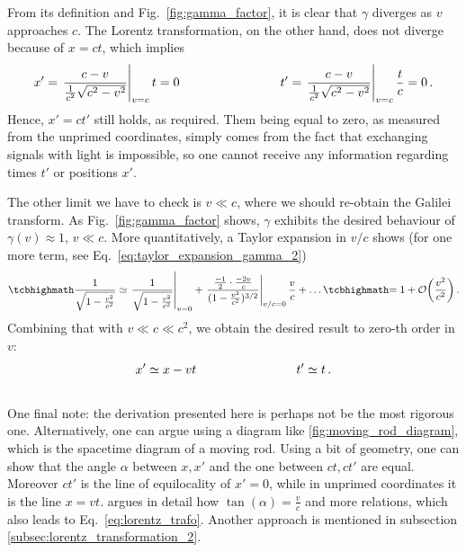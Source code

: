 \documentclass[../relativity_main.tex]{subfiles}
\begin{document}
From its definition and Fig.~\ref{fig:gamma_factor}, it is clear that $\gamma$ diverges as $v$ approaches $c$. The Lorentz transformation, on the other hand, does not diverge because of $x = ct$, which implies
\begin{align*}
	x' = \eval{\frac{c - v}{\frac{1}{c^2} \sqrt{c^2 - v^2}}}_{v = c} t = 0
	\manyqquad
	t' = \eval{\frac{c - v}{\frac{1}{c^2} \sqrt{c^2 - v^2}}}_{v = c} \frac{t}{c} = 0 \, .
\end{align*}
Hence, $x' = ct'$ still holds, as required. Them being equal to zero, as measured from the unprimed coordinates, simply comes from the fact that exchanging signals with light is impossible, so one cannot receive any information regarding times $t'$ or positions $x'$.


The other limit we have to check is $v \ll c$, where we should re-obtain the Galilei transform. As Fig.~\ref{fig:gamma_factor} shows, $\gamma$ exhibits the desired behaviour of $\gamma(v) \approx 1, \, v \ll c$. More quantitatively, a Taylor expansion in $v / c$ shows (for one more term, see Eq.~\eqref{eq:taylor_expansion_gamma_2})
\begin{equation}\label{eq:taylor_expansion_gamma}
	\eqbox{\frac{1}{\sqrt{1 - \frac{v^2}{c^2}}}} \simeq \eval{\frac{1}{\sqrt{1 - \frac{v^2}{c^2}}}}_{v = 0} + \eval{\frac{\frac{-1}{2} \cdot \frac{-2 v}{c}}{(1 - \frac{v^2}{c^2})^{3/2}}}_{v / c = 0} \frac{v}{c} + \dots \eqbox{= 1 + \mathcal{O}\qty(\frac{v^2}{c^2})} \, .
\end{equation}
Combining that with $v \ll c \ll c^2$, we obtain the desired result to zero-th order in $v$:
\begin{equation*}
	x' \simeq x - vt
	\qquad \qquad \qquad \qquad
	t' \simeq t
	\, .
\end{equation*}\\



One final note: the derivation presented here is perhaps not be the most rigorous one. Alternatively, one can argue using a diagram like \ref{fig:moving_rod_diagram}, which is the spacetime diagram of a moving rod. Using a bit of geometry, one can show that the angle $\alpha$ between $x, x'$ and the one between $ct, ct'$ are equal. Moreover $ct'$ is the line of equilocality of $x' = 0$, while in unprimed coordinates it is the line $x = vt$. \cite{giulini_srt} argues in detail how $\tan(\alpha) = \frac{v}{c}$ and more relations, which also leads to Eq.~\eqref{eq:lorentz_trafo}. Another approach is mentioned in subsection \ref{subsec:lorentz_transformation_2}.
\end{document}
